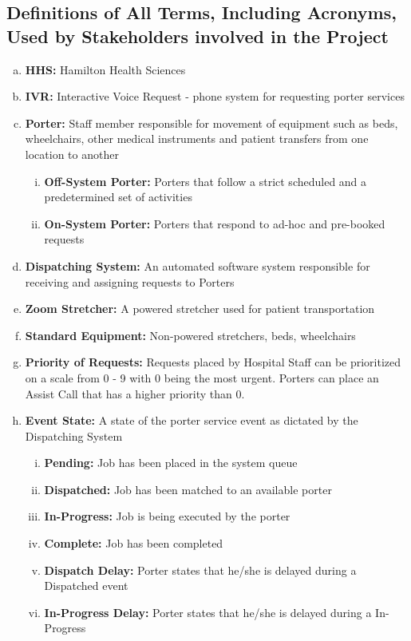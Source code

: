 \documentclass[paper=letter, fontsize=10pt]{scrartcl}
\numberwithin{equation}{section}		%
\numberwithin{figure}{section}			%
\numberwithin{table}{section}				%
\begin{document}
\subsection{Definitions of All Terms, Including Acronyms, Used by Stakeholders involved in the Project}
\begin{enumerate}[(a)]
	\item \textbf{HHS:} Hamilton Health Sciences
	\item \textbf{IVR:} Interactive Voice Request - phone system for requesting porter services
	\item \textbf{Porter:} Staff member responsible for movement of equipment such as beds, wheelchairs, other medical instruments and patient transfers from one location to another
	\begin{enumerate}[(i)]
		\item \textbf{Off-System Porter:} Porters that follow a strict scheduled and a predetermined set of activities
		\item \textbf{On-System Porter:} Porters that respond to ad-hoc and pre-booked requests	
	\end{enumerate}
	\item \textbf{Dispatching System:} An automated software system responsible for receiving and assigning requests to Porters
	\item \textbf{Zoom Stretcher:} A powered stretcher used for patient transportation
	\item \textbf{Standard Equipment:} Non-powered stretchers, beds, wheelchairs
	\item \textbf{Priority of Requests:} Requests placed by Hospital Staff can be prioritized on a scale from 0 - 9 with 0 being the most urgent. Porters can place an Assist Call that has a higher priority than 0.
	\item \textbf{Event State:} A state of the porter service event as dictated by the Dispatching System
	\begin{enumerate}[(i)]
		\item \textbf{Pending:} Job has been placed in the system queue
		\item \textbf{Dispatched:} Job has been matched to an available porter
		\item \textbf{In-Progress:} Job is being executed by the porter
		\item \textbf{Complete:} Job has been completed
		\item \textbf{Dispatch Delay:} Porter states that he/she is delayed during a Dispatched event
		\item \textbf{In-Progress Delay:} Porter states that he/she is delayed during a In-Progress		

\end{enumerate}
\end{enumerate}
\end{document}
